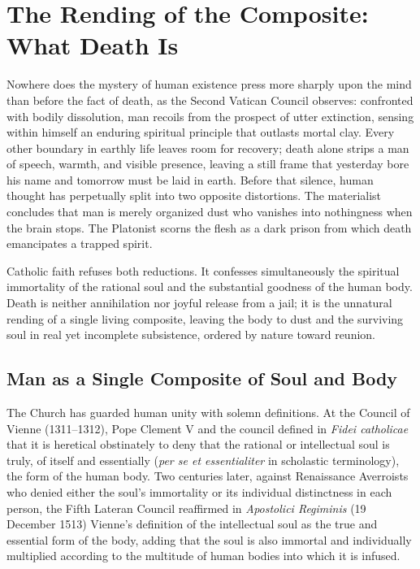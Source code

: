 \section{The Rending of the Composite: What Death Is}

Nowhere does the mystery of human existence press more sharply upon the mind than before the fact of death, as the Second Vatican Council observes: confronted with bodily dissolution, man recoils from the prospect of utter extinction, sensing within himself an enduring spiritual principle that outlasts mortal clay. Every other boundary in earthly life leaves room for recovery; death alone strips a man of speech, warmth, and visible presence, leaving a still frame that yesterday bore his name and tomorrow must be laid in earth. Before that silence, human thought has perpetually split into two opposite distortions. The materialist concludes that man is merely organized dust who vanishes into nothingness when the brain stops. The Platonist scorns the flesh as a dark prison from which death emancipates a trapped spirit.

Catholic faith refuses both reductions. It confesses simultaneously the spiritual immortality of the rational soul and the substantial goodness of the human body. Death is neither annihilation nor joyful release from a jail; it is the unnatural rending of a single living composite, leaving the body to dust and the surviving soul in real yet incomplete subsistence, ordered by nature toward reunion.

\subsection{Man as a Single Composite of Soul and Body}

The Church has guarded human unity with solemn definitions. At the Council of Vienne (1311--1312), Pope Clement V and the council defined in \emph{Fidei catholicae} that it is heretical obstinately to deny that the rational or intellectual soul is truly, of itself and essentially (\emph{per se et essentialiter} in scholastic terminology), the form of the human body. Two centuries later, against Renaissance Averroists who denied either the soul's immortality or its individual distinctness in each person, the Fifth Lateran Council reaffirmed in \emph{Apostolici Regiminis} (19 December 1513) Vienne's definition of the intellectual soul as the true and essential form of the body, adding that the soul is also immortal and individually multiplied according to the multitude of human bodies into which it is infused.

